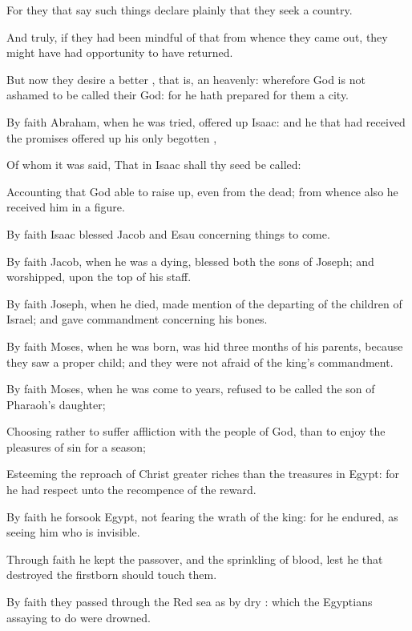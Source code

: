 {For they that
say such
things declare
plainly
that they
seek a
country.

And
truly,
if they had been
mindful of
that
{}
from
whence they came
out, they might have
had
opportunity to have
returned.

But
now they
desire a
better
{},
that
is, an
heavenly:
wherefore
God
is
not
ashamed to be
called
their
God:
for he hath
prepared for
them a
city.

By
faith
Abraham, when he was
tried, offered
up
Isaac:
and he that had
received the
promises offered
up his only
begotten
{},

Of
whom it was
said,
That
in
Isaac
shall
thy
seed be
called:

Accounting
that
God
{}
able to
raise
{}
up,
even
from the
dead; from
whence
also he
received
him
in a
figure.

By
faith
Isaac
blessed
Jacob
and
Esau
concerning things to
come.

By
faith
Jacob, when he was a
dying,
blessed
both the
sons of
Joseph;
and
worshipped,
{}
upon the
top
of
his
staff.

By
faith
Joseph, when he
died, made
mention
of the
departing of the
children of
Israel;
and gave
commandment
concerning
his
bones.

By
faith
Moses, when he was
born, was
hid three
months
of
his
parents,
because they
saw
{}
a
proper
child;
and they
were
not
afraid
of the
king’s
commandment.

By
faith
Moses, when he was
come to
years,
refused to be
called the
son
of
Pharaoh’s
daughter;

Choosing
rather to suffer affliction
with the
people of
God,
than to
enjoy the
pleasures of
sin for a
season;

Esteeming the
reproach of
Christ
greater
riches than the
treasures
in
Egypt:
for he had
respect
unto the recompence of the
reward.

By
faith he
forsook
Egypt,
not
fearing the
wrath of the
king:
for he
endured,
as
seeing him who is
invisible.

Through
faith he
kept the
passover,
and the
sprinkling of
blood,
lest he that
destroyed the
firstborn should
touch
them.

By
faith they passed
through
the
Red
sea
as
by
dry
{}:
which the
Egyptians
assaying to
do were
drowned.

}
